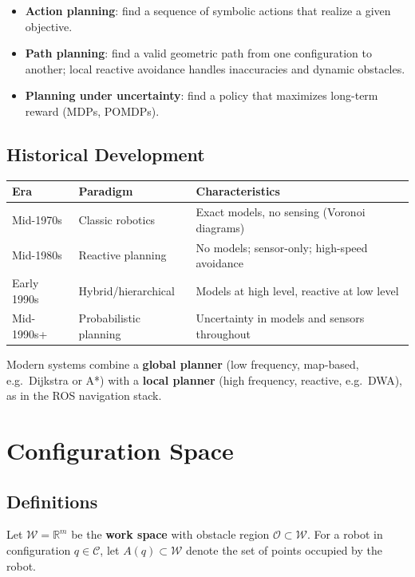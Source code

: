 \documentclass[11pt,a4paper]{article}
\theoremstyle{definition}
\theoremstyle{plain}
\theoremstyle{remark}
\begin{document}
\begin{itemize}
    \item \textbf{Action planning}: find a sequence of symbolic actions that realize a given objective.
    \item \textbf{Path planning}: find a valid geometric path from one configuration to another; local reactive avoidance handles inaccuracies and dynamic obstacles.
    \item \textbf{Planning under uncertainty}: find a policy that maximizes long-term reward (MDPs, POMDPs).
\end{itemize}

\subsection{Historical Development}

\begin{center}
\begin{tabular}{lll}
\hline
\textbf{Era} & \textbf{Paradigm} & \textbf{Characteristics} \\
\hline
Mid-1970s & Classic robotics & Exact models, no sensing (Voronoi diagrams) \\
Mid-1980s & Reactive planning & No models; sensor-only; high-speed avoidance \\
Early 1990s & Hybrid/hierarchical & Models at high level, reactive at low level \\
Mid-1990s+ & Probabilistic planning & Uncertainty in models and sensors throughout \\
\hline
\end{tabular}
\end{center}

Modern systems combine a \textbf{global planner} (low frequency, map-based, e.g.\ Dijkstra or A*) with a \textbf{local planner} (high frequency, reactive, e.g.\ DWA), as in the ROS navigation stack.

\section{Configuration Space}

\subsection{Definitions}

Let $\mathcal{W} = \mathbb{R}^m$ be the \textbf{work space} with obstacle region $\mathcal{O} \subset \mathcal{W}$. For a robot in configuration $q \in \mathcal{C}$, let $A(q) \subset \mathcal{W}$ denote the set of points occupied by the robot.
\end{document}
